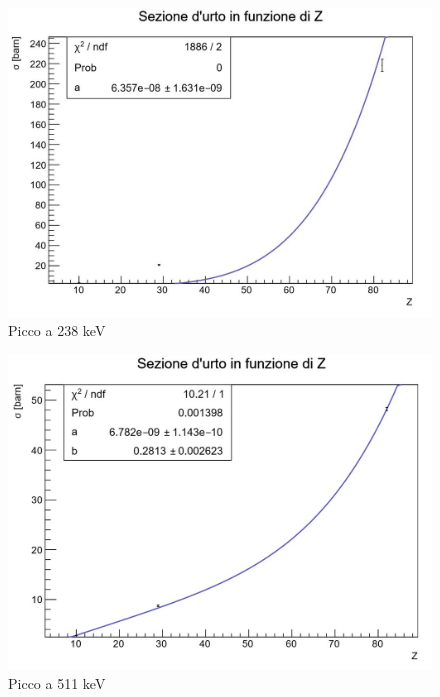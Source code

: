 \documentclass[a4paper,10pt]{article}
\begin{document}
\begin{figure}[H]
    \centering
    \includegraphics[scale=0.6]{grafici/picco238}
    \caption{Picco a 238 keV}
\end{figure}

\begin{figure}[H]
    \centering
    \includegraphics[scale=0.6]{grafici/picco511}
    \caption{Picco a 511 keV}
\end{figure}
\end{document}
